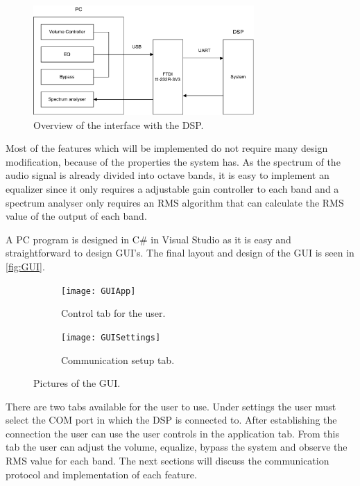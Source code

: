 \begin{figure}[H]
\centering
\includegraphics[width=0.75\textwidth]{figures/communicationBlock.pdf}
\caption{Overview of the interface with the DSP.}
\label{fig:communicationBlock}
\end{figure}

Most of the features which will be implemented do not require many design modification, because of the properties the system has. As the spectrum of the audio signal is already divided into octave bands, it is easy to implement an equalizer since it only requires a adjustable gain controller to each band and a spectrum analyser only requires an RMS algorithm that can calculate the RMS value of the output of each band. 

A PC program is designed in C\# in Visual Studio as it is easy and straightforward to design GUI's. The final layout and design of the GUI is seen in \autoref{fig:GUI}.

\begin{figure}[H]
\centering
\begin{subfigure}[t]{0.85\textwidth}
\texttt{[image: GUIApp]}
	\caption{Control tab for the user.}
	\label{fig:GUIApp}
\end{subfigure}
\hspace{6mm} 
\begin{subfigure}[t]{0.85\textwidth}
\texttt{[image: GUISettings]}
	\caption{Communication setup tab.}
	\label{fig:GUISettings}
\end{subfigure}
\caption{Pictures of the GUI.}
\label{fig:GUI}
\end{figure}

There are two tabs available for the user to use. Under settings the user must select the COM port in which the DSP is connected to. After establishing the connection the user can use the user controls in the application tab. From this tab the user can adjust the volume, equalize, bypass the system and observe the RMS value for each band. The next sections will discuss the communication protocol and implementation of each feature.


